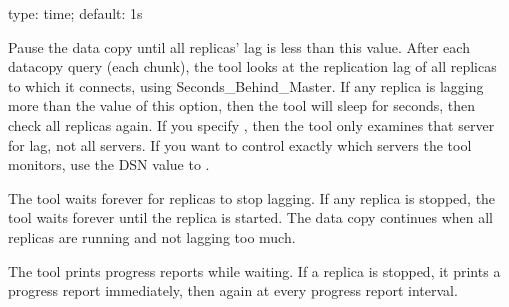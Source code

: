 \documentclass[letterpaper,10pt,english]{sphinxmanual}
\begin{document}

\begin{fulllineitems}
\label{\detokenize{mariadb-schema-change:cmdoption-mariadb-schema-change-max-lag}}
type: time; default: 1s

Pause the data copy until all replicas’ lag is less than this value.  After each
data\sphinxhyphen{}copy query (each chunk), the tool looks at the replication lag of
all replicas to which it connects, using Seconds\_Behind\_Master. If any replica
is lagging more than the value of this option, then the tool will sleep
for {\hyperref[\detokenize{mariadb-schema-change:cmdoption-mariadb-schema-change-check-interval}]{}} seconds, then check all replicas again.  If you
specify {\hyperref[\detokenize{mariadb-schema-change:cmdoption-mariadb-schema-change-check-slave-lag}]{}}, then the tool only examines that server for
lag, not all servers.  If you want to control exactly which servers the tool
monitors, use the DSN value to {\hyperref[\detokenize{mariadb-schema-change:cmdoption-mariadb-schema-change-recursion-method}]{}}.

The tool waits forever for replicas to stop lagging.  If any replica is
stopped, the tool waits forever until the replica is started.  The data copy
continues when all replicas are running and not lagging too much.

The tool prints progress reports while waiting.  If a replica is stopped, it
prints a progress report immediately, then again at every progress report
interval.

\end{fulllineitems}
\end{document}
